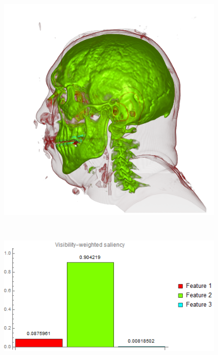 \begin{figure}
	\centering
	\begin{minipage}{.24\textwidth}
		\includegraphics[width=1\linewidth]{images/vismale_weak_red}
		\subcaption{}
	\end{minipage}~
	\begin{minipage}{.25\textwidth}
		\includegraphics[width=1\linewidth]{images/vismale_weak_red_visibility_saliency_weighted_chart}
		\subcaption{}
	\end{minipage}~
	\begin{minipage}{.24\textwidth}

\end{minipage}
\end{figure}
